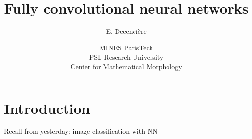 \documentclass[xcolor=pdftex,dvipsnames,table,mathserif]{beamer}
\title{Fully convolutional neural networks}
\author{E. Decencière}
\date{MINES ParisTech\\
  PSL Research University\\
  Center for Mathematical Morphology
}
\begin{document}
\frame{\titlepage}


\section{Introduction}









\begin{frame}{Recall from yesterday: image classification with NN}

\end{frame}
\end{document}
